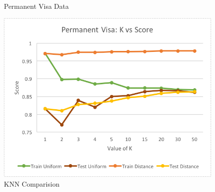 \documentclass[h]{article}
\begin{document}
\begin{figure}[H]
\begin{tabular}{ | c | c  | c | c | c | c | c |}
\hline
\end{tabular}
\caption*{Permanent Visa Data}
\endminipage\hfill
      \includegraphics[width=1\textwidth,keepaspectratio]{1_knn_compare.png} 
      \caption*{KNN Comparision} 
   \endminipage\hfill
\end{figure}
 
\end{document}
